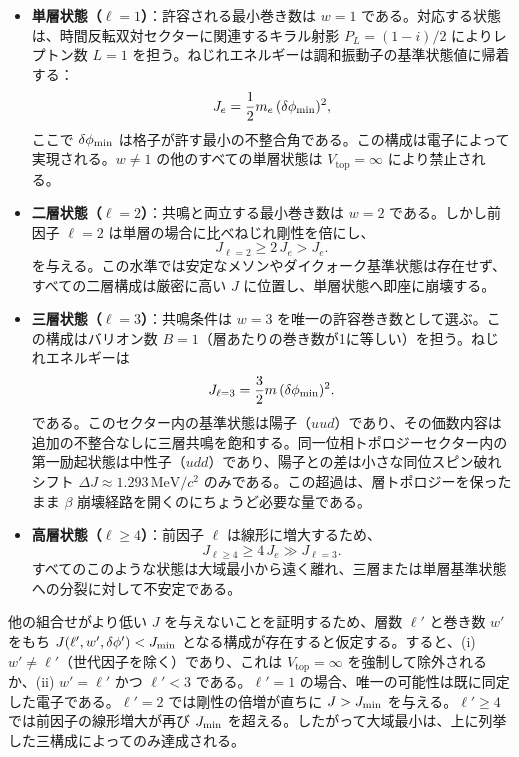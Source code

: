 \documentclass[dvipdfmx,a4paper]{article}
\begin{document}
\begin{itemize}
\item \textbf{単層状態（\(\ell=1\)）}：許容される最小巻き数は \(w=1\) である。対応する状態は、時間反転双対セクターに関連するキラル射影 \(P_L = (1-i)/2\) によりレプトン数 \(L=1\) を担う。ねじれエネルギーは調和振動子の基準状態値に帰着する：
  \[
  J_{e} = \frac12 m_e \,(\delta\phi_{\rm min})^2,
  \]
  ここで \(\delta\phi_{\rm min}\) は格子が許す最小の不整合角である。この構成は電子によって実現される。\(w\neq1\) の他のすべての単層状態は \(V_\text{top}=\infty\) により禁止される。

\item \textbf{二層状態（\(\ell=2\)）}：共鳴と両立する最小巻き数は \(w=2\) である。しかし前因子 \(\ell=2\) は単層の場合に比べねじれ剛性を倍にし、
  \[
  J_{\ell=2} \ge 2\,J_e > J_e.
  \]
  を与える。この水準では安定なメソンやダイクォーク基準状態は存在せず、すべての二層構成は厳密に高い \(J\) に位置し、単層状態へ即座に崩壊する。

\item \textbf{三層状態（\(\ell=3\)）}：共鳴条件は \(w=3\) を唯一の許容巻き数として選ぶ。この構成はバリオン数 \(B=1\)（層あたりの巻き数が1に等しい）を担う。ねじれエネルギーは
  \[
  J_{\ell=3} = \frac32 m \,(\delta\phi_{\rm min})^2.
  \]
  である。このセクター内の基準状態は陽子（\(uud\)）であり、その価数内容は追加の不整合なしに三層共鳴を飽和する。同一位相トポロジーセクター内の第一励起状態は中性子（\(udd\)）であり、陽子との差は小さな同位スピン破れシフト \(\Delta J \approx 1.293\,\mathrm{MeV}/c^2\) のみである。この超過は、層トポロジーを保ったまま \(\beta\) 崩壊経路を開くのにちょうど必要な量である。

\item \textbf{高層状態（\(\ell\ge4\)）}：前因子 \(\ell\) は線形に増大するため、
  \[
  J_{\ell\ge4} \ge 4\,J_e \gg J_{\ell=3}.
  \]
  すべてのこのような状態は大域最小から遠く離れ、三層または単層基準状態への分裂に対して不安定である。
\end{itemize}

他の組合せがより低い \(J\) を与えないことを証明するため、層数 \(\ell'\) と巻き数 \(w'\) をもち \(J(\ell',w',\delta\phi') < J_{\rm min}\) となる構成が存在すると仮定する。すると、(i) \(w'\neq\ell'\)（世代因子を除く）であり、これは \(V_\text{top}=\infty\) を強制して除外されるか、(ii) \(w'=\ell'\) かつ \(\ell' < 3\) である。\(\ell'=1\) の場合、唯一の可能性は既に同定した電子である。\(\ell'=2\) では剛性の倍増が直ちに \(J> J_{\rm min}\) を与える。\(\ell'\ge4\) では前因子の線形増大が再び \(J_{\rm min}\) を超える。したがって大域最小は、上に列挙した三構成によってのみ達成される。
\end{document}
